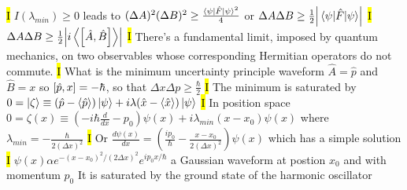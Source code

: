 \documentclass[fontsize=4pt]{scrartcl}
\begin{document}
 \hl{I}
 $I(\lambda_{min}) \geq 0$ leads to $(\Delta A)^2 (\Delta B)^2 \geq \frac{\expval{\hat{F}}{\psi}^2}{4}$ or $\Delta A \Delta B \geq \frac{1}{2} \abs{\expval{\hat{F}}{\psi}}$
 \hl{I}
 $\Delta A \Delta B \geq \frac{1}{2} \abs{i \expval{\comm{\hat{A}}{\hat{B}}}}$
 \hl{I}
 There's a fundamental limit, imposed by quantum mechanics, on two observables whose corresponding Hermitian operators do not commute.
\hl{I}
What is the minimum uncertainty principle waveform
$\hat{A} = \hat{p}$ and $\hat{B} = x$ so $\comm{\hat{p}}{x} = -\hbar$, so that $\Delta x \Delta p \geq \frac{\hbar}{2}$
\hl{I}
The minimum is saturated by $0= \ket{\zeta} \equiv (\hat{p} - \expval{\hat{p}})\ket{\psi} + i\lambda (\hat{x} - \expval{\hat{x}})\ket{\psi}$
\hl{I}
In position space $0 = \zeta(x) \equiv (-i\hbar \frac{d}{dx} - p_0) \psi(x) + i\lambda_{min}(x-x_0)\psi(x)$ where $\lambda_{min} = -\frac{\hbar}{2(\Delta x)^2}$
\hl{I}
Or $\frac{d \psi (x)}{dx} = (\frac{ip_0}{\hbar} - \frac{x-x_0}{2(\Delta x)^2})\psi(x)$ which has a simple solution 
\hl{I}
$\psi(x) \alpha e^{-(x-x_0)^2 / (2\Delta x)^2} e^{ip_0x/\hbar}$ a Gaussian waveform at postion $x_0$ and with momentum $p_0$ It is saturated by the ground state of the harmonic oscillator 
\end{document}
